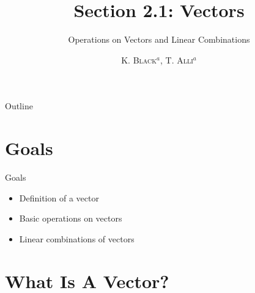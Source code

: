 \documentclass[svgnames,table,,aspectratio=169]{beamer}
\begin{document}
\author{\textsc{K. Black$^{a}$, T. Alli$^{a}$}}
\subject{Linear Algebra}


\title{Section 2.1: Vectors}
\subtitle{Operations on Vectors and Linear Combinations}

\date{} %

\begin{frame}
  \titlepage
\end{frame}

\begin{frame}{Outline}
  \tableofcontents
\end{frame}


\section{Goals}

\begin{frame}{Goals}

  \begin{itemize}
  \item Definition of a vector
  \item Basic operations on vectors
  \item Linear combinations of vectors
  \end{itemize}

\end{frame}

\section{What Is A Vector?}
\end{document}
